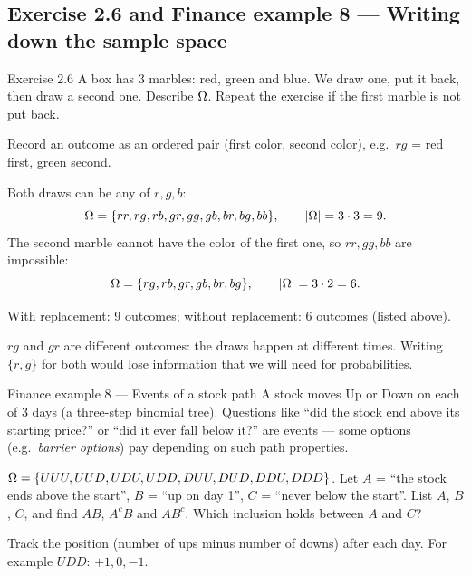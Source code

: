 \subsection{Exercise 2.6 and Finance example 8 --- Writing down the sample space}

\begin{task}{Exercise 2.6}
	A box has 3 marbles: red, green and blue. We draw one, put it back, then
	draw a second one. Describe $\Omega$. Repeat the exercise if the first marble
	is not put back.
\end{task}
\workspace{2.5cm}

\ifsolutions
	\soltitle
	\idea Record an outcome as an ordered pair (first color, second color),
	e.g.\ $rg$ = red first, green second.

	 Both draws can be any of $r,g,b$:
	\[ \Omega=\{rr,rg,rb,gr,gg,gb,br,bg,bb\},\qquad|\Omega|=3\cdot3=9. \]
	 The second marble cannot have the color of the
	first one, so $rr,gg,bb$ are impossible:
	\[ \Omega=\{rg,rb,gr,gb,br,bg\},\qquad|\Omega|=3\cdot2=6. \]
	\begin{answer}
		With replacement: 9 outcomes; without replacement: 6 outcomes (listed above).
	\end{answer}
	\begin{remark}
		$rg$ and $gr$ are different outcomes: the draws happen at different
		times. Writing $\{r,g\}$ for both would lose information that we will need
		for probabilities.
	\end{remark}
\fi

\begin{fin}{Finance example 8 --- Events of a stock path}
	\context A stock moves Up or Down on each of 3 days (a three-step binomial
	tree). Questions like ``did the stock end above its starting price?'' or
	``did it ever fall below it?'' are events --- some options (e.g.\
	\emph{barrier options}) pay depending on such path properties.

	$\Omega=\{UUU,UUD,UDU,UDD,DUU,DUD,DDU,DDD\}$. Let $A$ = ``the stock ends above
	the start'', $B$ = ``up on day 1'', $C$ = ``never below the start''. List
	$A$, $B$, $C$, and find $AB$, $A^cB$ and $AB^c$. Which inclusion holds
	between $A$ and $C$?
\end{fin}
\workspace{3cm}

\ifsolutions
	\soltitle
	\idea Track the position (number of ups minus number of downs) after each
	day. For example $UDD$: $+1,0,-1$.

